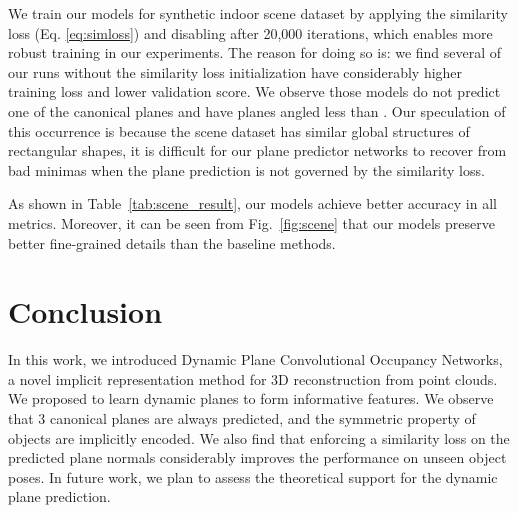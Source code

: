 \documentclass[10pt,twocolumn,letterpaper]{article}
\begin{document}
We train our models for synthetic indoor scene dataset by applying the similarity loss (Eq. \ref{eq:simloss}) and disabling after 20,000 iterations, which enables more robust training in our experiments.
The reason for doing so is: we find several of our runs without the similarity loss initialization have considerably higher training loss and lower validation score. We observe those models do not predict one of the canonical planes and have planes angled less than . Our speculation of this occurrence is because the scene dataset has similar global structures of rectangular shapes, it is difficult for our plane predictor networks to recover from bad minimas when the plane prediction is not governed by the similarity loss.

As shown in Table~\ref{tab:scene_result}, our models achieve better accuracy in all metrics. Moreover, it can be seen from Fig.~\ref{fig:scene} that our models preserve better fine-grained details than the baseline methods.

\section{Conclusion}
In this work, we introduced Dynamic Plane Convolutional Occupancy Networks, a novel implicit representation method for 3D reconstruction from point clouds. We proposed to learn dynamic planes to form informative features. We observe that 3 canonical planes are always predicted, and the symmetric property of objects are implicitly encoded. We also find that enforcing a similarity loss on the predicted plane normals considerably improves the performance on unseen object poses. In future work, we plan to assess the theoretical support for the dynamic plane prediction. \\ \\


{\small


}
\end{document}
